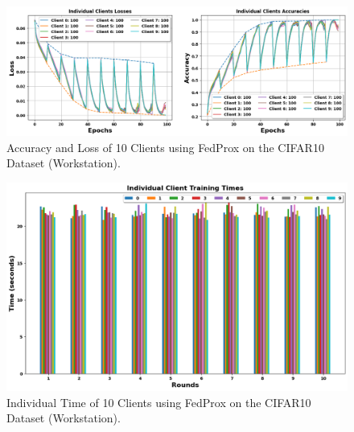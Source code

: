 \documentclass[conference]{IEEEtran}
\begin{document}
\begin{figure}[htp!]
	\centering
	\includegraphics[scale=.28]{Images/NEWGRAPHS/5.png }
	\caption{Accuracy and Loss of 10 Clients using FedProx on the CIFAR10 Dataset (Workstation).}
	\label{FedProxC10}
\end{figure}

\begin{figure}[htp!]
	\centering
	\includegraphics[scale=.3]{Images/NEWGRAPHS/6.png }
	\caption{Individual Time of 10 Clients using FedProx on the CIFAR10 Dataset (Workstation).}
	\label{FedProxTimeC10}
\end{figure}


%
\end{document}
